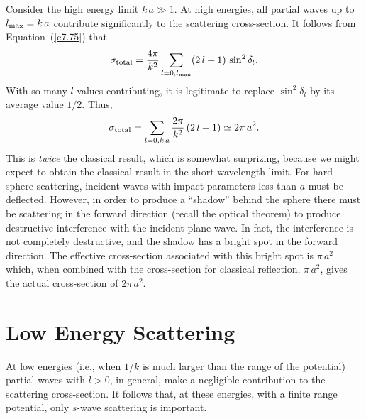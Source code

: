 Consider the high energy limit $k\,a\gg 1$. At high energies, all partial
waves up to $l_{\rm max} = k\,a$ contribute significantly to
the scattering cross-section. It follows from Equation~(\ref{e7.75}) that
\begin{equation}\label{e7.99}
\sigma_{\rm total} = \frac{4\pi}{k^2} \sum_{l=0,l_{\rm max}}
(2\,l+1)\,\sin^2\delta_l.
\end{equation}
With so many $l$ values contributing, it is legitimate to replace
$\sin^2\delta_l$ by its average value $1/2$. Thus,
\begin{equation}
\sigma_{\rm total} = \sum_{l=0,k\,a} \frac{2\pi}{k^2} \,(2\,l+1) \simeq 
2\pi \,a^2.
\end{equation}
This is {\em twice}\/ the classical result, which is  somewhat surprizing,
because we might expect to obtain the classical result in the short
wavelength limit. For hard sphere scattering, incident waves with
impact parameters less than $a$ must be deflected. However, in order to
produce a ``shadow'' behind the sphere there must be scattering
in the forward direction (recall the optical theorem) to produce
destructive interference with the incident plane wave. In fact, the
interference is not completely destructive, and the shadow has a bright
spot in the forward direction. The effective cross-section associated with
this bright spot is $\pi \,a^2$ which, when combined with the
cross-section for classical reflection, $\pi \,a^2$, gives the actual
cross-section of $2\pi \,a^2$.
 
\section{Low Energy Scattering}
At low energies ({\rm i.e.}, when $1/k$ is much larger than the range
of the potential) partial waves with $l>0$, in general, make a
negligible contribution to the scattering cross-section. It follows
that, at these energies, with a finite range potential, only $s$-wave
scattering is important.

